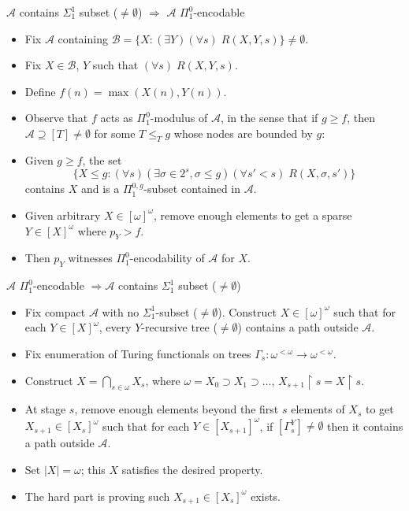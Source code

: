 \begin{frame}{$\mathcal{A}$ contains $\Sigma_1^1$ subset ($\neq\emptyset$)
$\Rightarrow$ $\mathcal{A}$ $\Pi_1^0$-encodable}
  \begin{itemize}
    \item Fix $\mathcal{A}$ containing $\mathcal{B} =\{X: (\exists
      Y)(\forall s)\; R(X,Y,s)\} \neq\emptyset$.
    \item Fix $X\in\mathcal{B}$, $Y$ such that $(\forall s)\;R(X,Y,s)$.
    \item Define $f(n)=\max(X(n),Y(n))$.
    \item Observe that $f$ acts as $\Pi_1^0$-modulus of $\mathcal{A}$, in
      the sense that if $g\geq f$, then $\mathcal{A}\supseteq[T]
      \neq\emptyset$ for some $T\leq_T g$ whose nodes are bounded by $g$:
    \item Given $g\geq f$, the set
      \[\{X\leq g:(\forall s)(\exists \sigma\in 2^s, \sigma\leq g)(\forall
      s'<s)\; R(X,\sigma,s')\}\]
      contains $X$ and is a $\Pi_1^{0,g}$-subset contained in
      $\mathcal{A}$.
    \item Given arbitrary $X\in[\omega]^\omega$, remove enough elements to
      get a sparse $Y\in[X]^\omega$ where $p_Y>f$.
    \item Then $p_Y$ witnesses $\Pi_1^0$-encodability of $\mathcal{A}$ for
      $X$.
  \end{itemize}
\end{frame}

\begin{frame}{$\mathcal{A}$ $\Pi_1^0$-encodable $\Rightarrow \mathcal{A}$
contains $\Sigma_1^1$ subset ($\neq\emptyset$)}
  \begin{itemize}
    \item Fix compact $\mathcal{A}$ with no $\Sigma_1^1$-subset
      ($\neq\emptyset$). Construct $X\in[\omega]^\omega$ such that for each
      $Y\in[X]^\omega$, every $Y$-recursive tree ($\neq\emptyset$) contains
      a path outside $\mathcal{A}$.

    \item Fix enumeration of Turing functionals on trees
      $\Gamma_s:\omega^{<\omega} \rightarrow \omega^{<\omega}$.

    \item Construct $X=\bigcap_{s\in\omega}X_s$, where
      $\omega=X_0\supset X_1\supset\ldots$, $X_{s+1}\restriction
      s=X\restriction s$.

    \item At stage $s$, remove enough elements beyond the first $s$
      elements of $X_s$ to get $X_{s+1}\in[X_s]^\omega$ such that for each
      $Y\in[X_{s+1}]^\omega$, if $[\Gamma_s^Y]\neq\emptyset$ then it
      contains a path outside $\mathcal{A}$.

    \item Set $|X|=\omega$; this $X$ satisfies the desired property.

    \item The hard part is proving such $X_{s+1}\in[X_s]^\omega$ exists.
  \end{itemize}
\end{frame}

